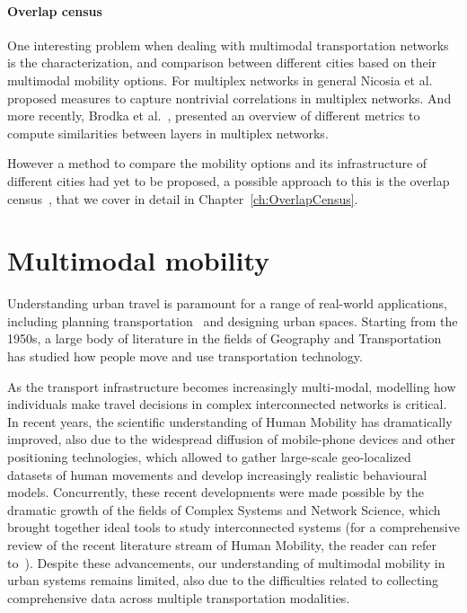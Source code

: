 \paragraph*{Overlap census}\label{overlap}
One interesting problem when dealing with multimodal transportation networks is the characterization, and comparison between different cities based on their multimodal mobility options. For multiplex networks in general Nicosia et al.~\cite{nicosia2015measuring} proposed measures to capture nontrivial correlations in multiplex networks. And more recently, Brodka et al.~\cite{brodka2017similarity}, presented an overview of different metrics to compute similarities between layers in multiplex networks.

However a method to compare the mobility options and its infrastructure of different cities had yet to be proposed, a possible approach to this is the overlap census~\cite{natera2020multimodal}, that we cover in detail in Chapter~\ref{ch:OverlapCensus}.


\section{Multimodal mobility}\label{sec:multimodalmobility}

Understanding urban travel is paramount for a range of real-world applications, including planning transportation~\cite{patriksson2015traffic} and designing urban spaces. Starting from the 1950s, a large body of literature in the fields of Geography and Transportation has studied how people move and use transportation technology. 

As the transport infrastructure becomes increasingly multi-modal, modelling how individuals make travel decisions in complex interconnected networks is critical. In recent years, the scientific understanding of Human Mobility has dramatically improved, also due to the widespread diffusion of mobile-phone devices and other positioning technologies, which allowed to gather large-scale geo-localized datasets of human movements and develop increasingly realistic behavioural models. Concurrently, these recent developments were made possible by the dramatic growth of the fields of Complex Systems and Network Science, which brought together ideal tools to study interconnected systems (for a comprehensive review of the recent literature stream of Human Mobility, the reader can refer to~\cite{barbosa2018human}). Despite these advancements, our understanding of multimodal mobility in urban systems remains limited, also due to the difficulties related to collecting comprehensive data across multiple transportation modalities. 

